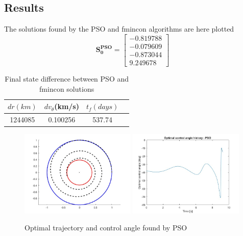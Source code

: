 \documentclass{report}
\begin{document}
\subsection*{Results}
The solutions found by the PSO and fmincon algorithms are here plotted
\begin{equation} 
    \boldsymbol{S^{PSO}_0 = \begin{bmatrix}
        -0.819788 \\
        -0.079609 \\
        -0.873044 \\
        9.249678 
    \end{bmatrix}}
\end{equation}
\begin{table}[h]
    \centering
    \begin{tabular}{|c|c|c|c|}
        \hline
        $dr(km)$ & $dv_\theta$(km/s) & $t_f(days)$  \\
        \hline
        1244085 & 0.100256 & 537.74 \\
        \hline
    \end{tabular}
    \caption{Final state difference between PSO and fmincon solutions}
\end{table}
\begin{figure}[h]
    \centering
    \includegraphics[width=0.49\textwidth]{results/pso_opt.jpg}
    \includegraphics[width=0.49\textwidth]{results/a_pso.jpg}
    \caption{Optimal trajectory and control angle found by PSO}
\end{figure}\\
\end{document}
